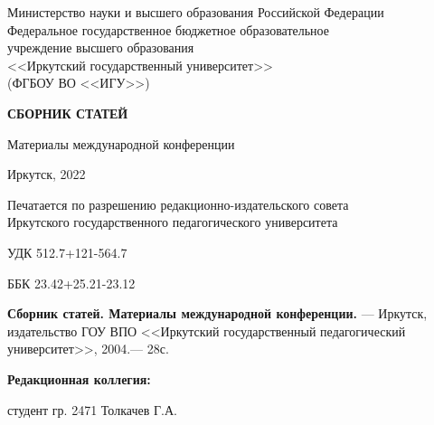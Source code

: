 \documentclass{book}
\begin{document}
\thispagestyle{empty}
\begin{center}
Министерство науки и высшего образования Российской Федерации\\
Федеральное государственное бюджетное образовательное\\
учреждение высшего образования\\
<<Иркутский государственный университет>>\\
(ФГБОУ ВО <<ИГУ>>)
\end{center}

\vspace{3.5cm}

\begin{center}
{\bf 
СБОРНИК СТАТЕЙ\\[1mm]
}  

\vspace{0.3cm}

{
Материалы международной конференции\\[1mm]

} %
\end{center}



\vfill 
\noindent
\begin{minipage}{\textwidth}
\centering	 Иркутск, 2022
\end{minipage}
\newpage
\thispagestyle{empty}
\begin{center}
Печатается по разрешению редакционно-издательского совета\\
Иркутского государственного педагогического университета

\end{center}

УДК 512.7+121-564.7

ББК 23.42+25.21-23.12
\vspace{1.5cm}



\textbf{Сборник статей. Материалы международной конференции.} --- Иркутск, издательство ГОУ ВПО <<Иркутский государственный педагогический университет>>, 2004.--- 28с.

\vspace{4.3cm}
\textbf{Редакционная коллегия:}

\setlength{\leftskip}{1.5cm}
студент гр. 2471 Толкачев Г.А. 

\setlength{\leftskip}{0pt}


\newpage
\renewcommand{\contentsname}{Содержание}
\noindent\tableofcontents
\thispagestyle{empty}
\newpage\null\thispagestyle{empty}\newpage
\end{document}
